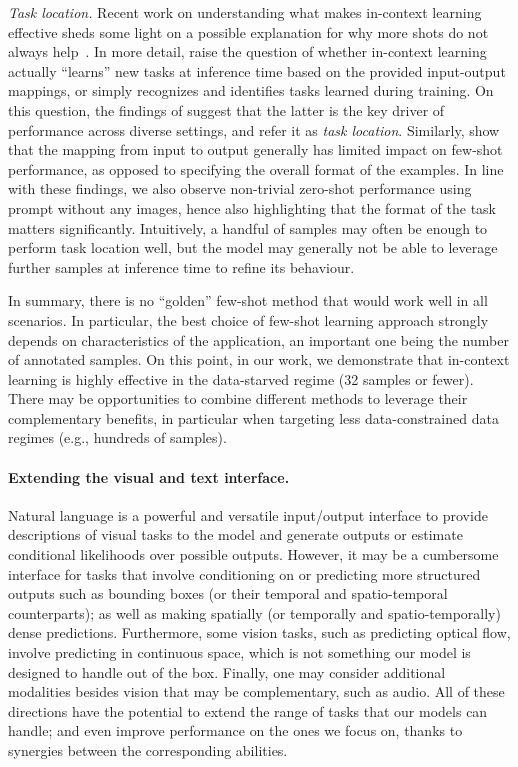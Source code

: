 \noindent
\textit{Task location.}
Recent work on understanding what makes in-context learning effective sheds some light on a possible explanation for why more shots do not always help~\citep{reynolds2021prompt,min2022rethinking}.
In more detail, \citet{gpt3} raise the question of whether in-context learning actually ``learns'' new tasks at inference time based on the provided input-output mappings, or simply recognizes and identifies tasks learned during training. On this question, the findings of \citet{reynolds2021prompt} suggest that the latter is the key driver of performance across diverse settings, and refer it as \emph{task location}.
Similarly, \citet{min2022rethinking} show that the mapping from input to output generally has limited impact on few-shot performance, as opposed to specifying the overall format of the examples.
In line with these findings, we also observe non-trivial zero-shot performance using prompt without any images, hence also highlighting that the format of the task matters significantly.
Intuitively, a handful of samples may often be enough to perform task location well, but the model may generally not be able to leverage further samples at inference time to refine its behaviour. 



In summary, there is no ``golden'' few-shot method that would work well in all scenarios.
In particular, the best choice of few-shot learning approach strongly depends on characteristics of the application, an important one being the number of annotated samples.
On this point, in our work, we demonstrate that in-context learning is highly effective in the data-starved regime (32 samples or fewer).
There may be opportunities to combine different methods to leverage their complementary benefits, in particular when targeting less data-constrained data regimes (e.g., hundreds of samples).




\paragraph{Extending the visual and text interface.}
Natural language is a powerful and versatile input/output interface to provide descriptions of visual tasks to the model and generate outputs or estimate conditional likelihoods over possible outputs.
However, it may be a cumbersome interface for tasks that involve conditioning on or predicting more structured outputs such as bounding boxes (or their temporal and spatio-temporal counterparts); as well as making spatially (or temporally and spatio-temporally) dense predictions.
Furthermore, some vision tasks, such as predicting optical flow, involve predicting in continuous space, which is not something our model is designed to handle out of the box.
Finally, one may consider additional modalities besides vision that may be complementary, such as audio.
All of these directions have the potential to extend the range of tasks that our models can handle; and even improve performance on the ones we focus on, thanks to synergies between the corresponding abilities.

